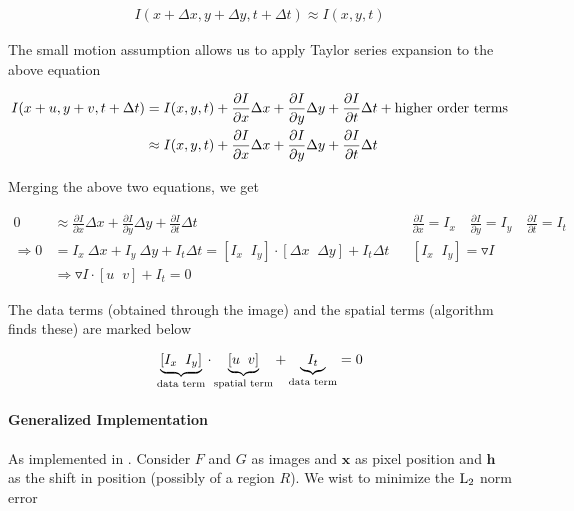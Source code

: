 \begin{align*}
    I(x+\Delta x, y+\Delta y, t+\Delta t) \approx I(x, y, t)
\end{align*}

The small motion assumption allows us to apply Taylor series expansion to the above equation

\begin{align}
    I(x+u, y+v, t+\Delta t) &= I(x, y, t) + \frac{\partial I}{\partial x} \Delta x + \frac{\partial I}{\partial y} \Delta y + \frac{\partial I}{\partial t} \Delta t + \textup{higher order terms}
    \nonumber \\
    &\approx I(x, y, t) + \frac{\partial I}{\partial x} \Delta x + \frac{\partial I}{\partial y} \Delta y + \frac{\partial I}{\partial t} \Delta t
    \label{}
\end{align}

Merging the above two equations, we get

\begin{align*}
    0 &\approx \frac{\partial I}{\partial x} \Delta x + \frac{\partial I}{\partial y} \Delta y + \frac{\partial I}{\partial t} \Delta t 
    &&
    \frac{\partial I}{\partial x} = I_x \quad
    \frac{\partial I}{\partial y} = I_y \quad
    \frac{\partial I}{\partial t} = I_t
    \\
    \Rightarrow 0 &= I_x \: \Delta x + I_y \: \Delta y + I_t \Delta t = \left[ I_x \;\; I_y \right] \cdot \left[ \Delta x \;\; \Delta y \right] + I_t \Delta t 
    &&
    \left[ I_x \;\; I_y \right] = \triangledown I
    \\
    & \Rightarrow \triangledown I \cdot \left[ u \;\; v \right] + I_t = 0
\end{align*}

The data terms (obtained through the image) and the spatial terms (algorithm finds these) are marked below

\begin{equation}
    \underbrace{\left[ I_x \;\; I_y \right]}_{\textup{data term}} \cdot \underbrace{\left[ u \;\; v \right]}_{\textup{spatial term}} + \underbrace{I_t}_{\textup{data term}} = 0
    \label{eq:q1-oflow-direct}
\end{equation}

\paragraph*{Generalized Implementation}
As implemented in \cite{lucas1981iterative}. Consider $F$ and $G$ as images and $\mathbf{x}$ as pixel position and $\mathbf{h}$ as the shift in position (possibly of a region $R$). We wist to minimize the $\textup{L}_2$ norm error

